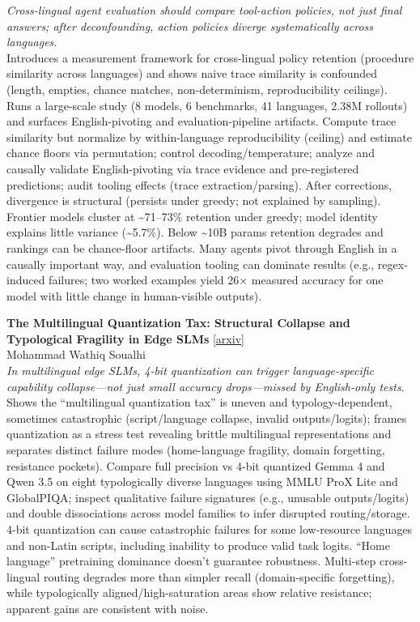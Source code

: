 \documentclass[12pt,letterpaper]{article}
\begin{document}
{\small\textit{Cross-lingual agent evaluation should compare tool-action policies, not just final answers; after deconfounding, action policies diverge systematically across languages.}}\\[1pt]
{\footnotesize Introduces a measurement framework for cross-lingual policy retention (procedure similarity across languages) and shows naive trace similarity is confounded (length, empties, chance matches, non-determinism, reproducibility ceilings). Runs a large-scale study (8 models, 6 benchmarks, 41 languages, 2.38M rollouts) and surfaces English-pivoting and evaluation-pipeline artifacts. Compute trace similarity but normalize by within-language reproducibility (ceiling) and estimate chance floors via permutation; control decoding/temperature; analyze and causally validate English-pivoting via trace evidence and pre-registered predictions; audit tooling effects (trace extraction/parsing). After corrections, divergence is structural (persists under greedy; not explained by sampling). Frontier models cluster at \textasciitilde{}71--73\% retention under greedy; model identity explains little variance (\textasciitilde{}5.7\%). Below \textasciitilde{}10B params retention degrades and rankings can be chance-floor artifacts. Many agents pivot through English in a causally important way, and evaluation tooling can dominate results (e.g., regex-induced failures; two worked examples yield 26× measured accuracy for one model with little change in human-visible outputs).}

\medskip

{\small\textbf{The Multilingual Quantization Tax: Structural Collapse and Typological Fragility in Edge SLMs}} {\scriptsize[\href{https://arxiv.org/abs/2608.09941}{arxiv}]}\\
{\scriptsize Mohammad Wathiq Soualhi}\\

{\small\textit{In multilingual edge SLMs, 4-bit quantization can trigger language-specific capability collapse---not just small accuracy drops---missed by English-only tests.}}\\[1pt]
{\footnotesize Shows the ``multilingual quantization tax'' is uneven and typology-dependent, sometimes catastrophic (script/language collapse, invalid outputs/logits); frames quantization as a stress test revealing brittle multilingual representations and separates distinct failure modes (home-language fragility, domain forgetting, resistance pockets). Compare full precision vs 4-bit quantized Gemma 4 and Qwen 3.5 on eight typologically diverse languages using MMLU ProX Lite and GlobalPIQA; inspect qualitative failure signatures (e.g., unusable outputs/logits) and double dissociations across model families to infer disrupted routing/storage. 4-bit quantization can cause catastrophic failures for some low-resource languages and non-Latin scripts, including inability to produce valid task logits. ``Home language'' pretraining dominance doesn't guarantee robustness. Multi-step cross-lingual routing degrades more than simpler recall (domain-specific forgetting), while typologically aligned/high-saturation areas show relative resistance; apparent gains are consistent with noise.}
\end{document}
